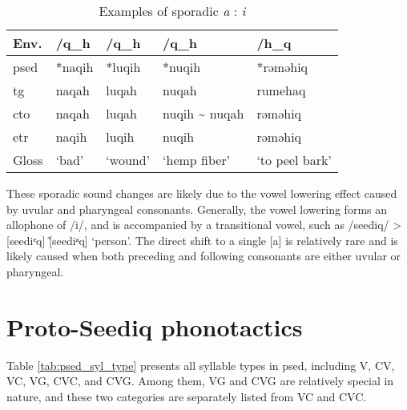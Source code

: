 \begin{table}[!htbp]
\centering
\caption{Examples of sporadic \textit{a} : \textit{i}}
\label{tab:irr_a_i}
\begin{tabular}{lllll}
\hline
Env.      & /q\_h  & /q\_h   & /q\_h            & /h\_q          \\ \hline
\ac{psed} & *naqih & *luqih  & *nuqih           & *rəməhiq       \\ \hdashline
\ac{tg}   & naqah  & luqah   & nuqah            & rumehaq        \\
\ac{cto}  & naqah  & luqah   & nuqih \~{} nuqah & rəməhiq        \\
\ac{etr}  & naqih  & luqih   & nuqih            & rəməhiq        \\ \hline
Gloss     & `bad'  & `wound' & `hemp fiber'     & `to peel bark' \\ \hline
\end{tabular}
\end{table}

These sporadic sound changes are likely due to the vowel lowering effect caused by uvular and pharyngeal consonants. Generally, the vowel lowering forms an allophone of /i/, and is accompanied by a transitional vowel, such as /seediq/ > [seediᵉq] \~ [seediᵃq] `person'. The direct shift to a single [a] is relatively rare and is likely caused when both preceding and following consonants are either uvular or pharyngeal.

\section{Proto-Seediq phonotactics} \label{sec:psed_phonotactics}

Table \ref{tab:psed_syl_type} presents all syllable types in \acl{psed}, including V, CV, VC, VG, CVC, and CVG. Among them, VG and CVG are relatively special in nature, and these two categories are separately listed from VC and CVC.

